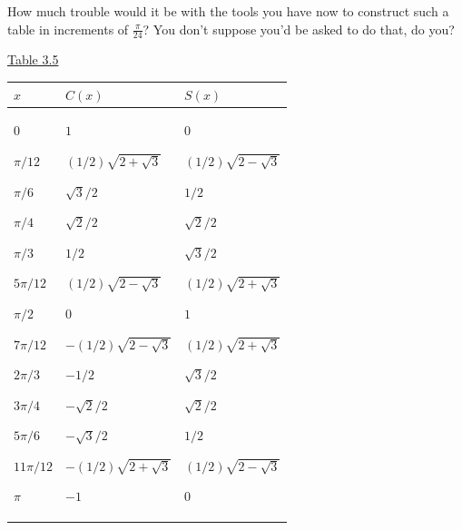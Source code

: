 \documentclass[english]{book}
\begin{document}
How much trouble would it be with the tools you have now to construct such a table in increments of $\frac{\pi}{24}$? You don't suppose you'd be asked to do that, do you?

\begin{center}
\underline{Table 3.5}
\end{center}
\begin{table}[htbp]
\begin{center}
\begin{tabular}{|p{40pt}|p{80pt}|p{80pt}|}
\hline $x$ & $C(x)$ & $S(x)$ \\
\hline $0$ \par $\pi/12$ \par $\pi/6$ \par $\pi/4$ \par $\pi/3$ \par $5\pi/12$ \par $\pi/2$
\par $7\pi/12$ \par $2\pi/3$ \par $3\pi/4$ \par $5\pi/6$ \par $11\pi/12$ \par $\pi$
& $1$ \par $(1/2)\sqrt{2+\sqrt{3}}$ \par $\sqrt{3}/2$ \par $\sqrt{2}/2$ \par $1/2$ \par $(1/2)\sqrt{2-\sqrt{3}}$ \par $0$ \par $-(1/2)\sqrt{2-\sqrt{3}}$ \par $-1/2$ \par $-\sqrt{2}/2$ \par $-\sqrt{3}/2$ \par $-(1/2)\sqrt{2+\sqrt{3}}$ \par $-1$
& $0$ \par $(1/2)\sqrt{2-\sqrt{3}}$ \par $1/2$ \par $\sqrt{2}/2$ \par $\sqrt{3}/2$ \par $(1/2)\sqrt{2+\sqrt{3}}$ \par $1$ \par $(1/2)\sqrt{2+\sqrt{3}}$ \par $\sqrt{3}/2$ \par $\sqrt{2}/2$ \par $1/2$ \par $(1/2)\sqrt{2-\sqrt{3}}$ \par $0$ \\
\hline
\end{tabular}
\label{tbl3.5hints}
\end{center}
\end{table}
\end{document}
